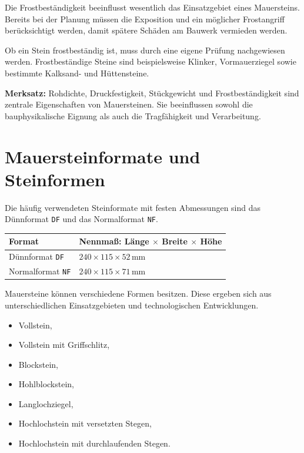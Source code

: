 \documentclass[
  12pt,
  a4paper,
  oneside
]{scrreprt}
\begin{document}
Die Frostbeständigkeit beeinflusst wesentlich das Einsatzgebiet eines
Mauersteins. Bereits bei der Planung müssen die Exposition und ein
möglicher Frostangriff berücksichtigt werden, damit spätere Schäden am
Bauwerk vermieden werden.


Ob ein Stein frostbeständig ist, muss durch eine eigene Prüfung
nachgewiesen werden. Frostbeständige Steine sind beispielsweise
Klinker, Vormauerziegel sowie bestimmte Kalksand- und Hüttensteine.


\begin{merksatzbox}
\textbf{Merksatz:}
Rohdichte, Druckfestigkeit, Stückgewicht und Frostbeständigkeit sind
zentrale Eigenschaften von Mauersteinen. Sie beeinflussen sowohl die
bauphysikalische Eignung als auch die Tragfähigkeit und Verarbeitung.

\end{merksatzbox}

\section{Mauersteinformate und Steinformen}

Die häufig verwendeten Steinformate mit festen Abmessungen sind das
Dünnformat \texttt{DF} und das Normalformat \texttt{NF}.

\begin{longtable}{
  >{\raggedright\arraybackslash}p{}
  >{\centering\arraybackslash}p{}
}
\toprule
\textbf{Format} &
\textbf{Nennmaß: Länge $\times$ Breite $\times$ Höhe} \\
\midrule
\endhead

Dünnformat \texttt{DF} &
$240 \times 115 \times 52\,\mathrm{mm}$ \\

Normalformat \texttt{NF} &
$240 \times 115 \times 71\,\mathrm{mm}$ \\

\bottomrule
\end{longtable}



Mauersteine können verschiedene Formen besitzen. Diese ergeben sich aus
unterschiedlichen Einsatzgebieten und technologischen Entwicklungen.

\begin{itemize}
  \item Vollstein,
  \item Vollstein mit Griffschlitz,
  \item Blockstein,
  \item Hohlblockstein,
  \item Langlochziegel,
  \item Hochlochstein mit versetzten Stegen,
  \item Hochlochstein mit durchlaufenden Stegen.
\end{itemize}
\end{document}
